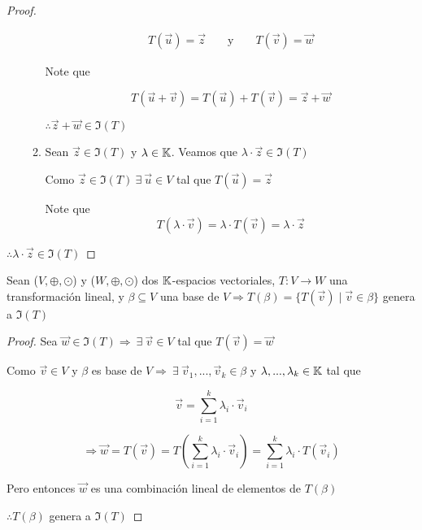 \begin{proof}
\begin{enumerate}
\begin{enumerate}
            \begin{align*}
                T(\vec{u}) = \vec{z} && \text{ y } && T(\vec{v}) = \vec{w}
            \end{align*}
            
            Note que

            $$T(\vec{u}+\vec{v}) = T(\vec{u})+T(\vec{v}) = \vec{z} + \vec{w} $$

            $\therefore \vec{z} + \vec{w} \in \Im(T)$
            
            \item Sean $\vec{z} \in \Im(T)$ y $\lambda \in \mathbb{K}$. Veamos que $\lambda \cdot \vec{z} \in \Im(T)$

            Como $\vec{z} \in \Im(T) \: \exists \: \vec{u} \in V$ tal que $T(\vec{u}) = \vec{z}$

            Note que
            $$T(\lambda \cdot \vec{v}) = \lambda \cdot T(\vec{v}) = \lambda \cdot \vec{z}$$
        \end{enumerate}
    \end{enumerate}
    $\therefore \lambda \cdot \vec{z} \in \Im(T)$
\end{proof}

\begin{theorem} \label{theomonline2}
    Sean ($V, \oplus, \odot$) y ($W, \oplus, \odot$) dos $\mathbb{K}$-espacios vectoriales, $T : V \to W$ una transformación lineal, y $\beta \subseteq V$ una base de $V \Rightarrow T(\beta) = \{ T(\vec{v}) \mid \vec{v} \in \beta \}$ genera a $\Im(T)$
\end{theorem}

\begin{proof}
    Sea $\vec{w} \in \Im(T) \Rightarrow \: \exists \: \vec{v} \in V$ tal que $T(\vec{v}) = \vec{w}$

    Como $\vec{v} \in V$ y $\beta$ es base de $V \Rightarrow \: \exists \: \vec{v}_{1}, ..., \vec{v}_{k} \in \beta$ y $\lambda, ..., \lambda_k \in \mathbb{K}$ tal que 

    $$\vec{v} = \sum_{i=1}^{k} \lambda_i \cdot \vec{v}_i$$

    $$\Rightarrow \vec{w} = T(\vec{v}) = T\left(  \sum_{i=1}^{k} \lambda_i \cdot \vec{v}_i \right) =  \sum_{i=1}^{k} \lambda_i \cdot T(\vec{v}_i) $$

    Pero entonces $\vec{w}$ es una combinación lineal de elementos de $T(\beta)$

    $\therefore T(\beta)$ genera a $\Im(T)$
\end{proof}

